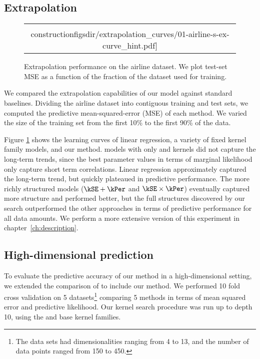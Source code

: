 \subsection{Extrapolation}

\begin{figure}
\centering
\begin{tabular}{c}
\hspace{-0.0cm} \texttt{[image: \\constructionfigsdir/extrapolation\_curves/01-airline-s-ex-curve\_hint.pdf]}
\end{tabular}
\caption[Extrapolation performance on the airline dataset.]{Extrapolation performance on the airline dataset.  We plot test-set MSE as a function of the fraction of the dataset used for training. 
}
\label{fig:extrapolation}
\end{figure}

We compared the extrapolation capabilities of our model against standard baselines\footnotemark.
Dividing the airline dataset into contiguous training and test sets, we computed the predictive mean-squared-error (MSE) of each method.
We varied the size of the training set from the first 10\% to the first 90\% of the data.

Figure \ref{fig:extrapolation} shows the learning curves of linear regression, a variety of fixed kernel family \gp{} models, and our method.  
\gp{} models with only \kSE{} and \kPer{} kernels did not capture the long-term trends, since the best parameter values in terms of \gp{} marginal likelihood only capture short term correlations. 
Linear regression approximately captured the long-term trend, but quickly plateaued in predictive performance.
The more richly structured \gp{} models (${\kSE + \kPer}$ and ${\kSE \times \kPer}$) eventually captured more structure and performed better, but the full structures discovered by our search outperformed the other approaches in terms of predictive performance for all data amounts.
We perform a more extensive version of this experiment in chapter~\ref{ch:description}.


\subsection{High-dimensional prediction}

To evaluate the predictive accuracy of our method in a high-dimensional setting, we extended the comparison of \cite{Duvenaud2011-wb} to include our method.
We performed 10 fold cross validation on 5 datasets\footnote{The data sets had dimensionalities ranging from 4 to 13, and the number of data points ranged from 150 to 450.} comparing 5 methods in terms of mean squared error and predictive likelihood.
Our kernel search procedure was run up to depth 10, using the \SE{} and \RQ{} base kernel families\footnotemark{}.

